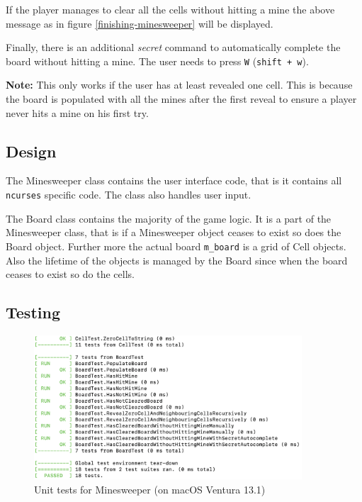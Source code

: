 \documentclass[12pt]{article}
\begin{document}
If the player manages to clear all the cells without hitting a
mine the above message as in figure \ref{finishing-minesweeper}
will be displayed.

Finally, there is an additional \textit{secret} command to
automatically complete the board without hitting a mine. The
user needs to press \texttt{W} (\texttt{shift + w}).

\textbf{Note:} This only works if the user has at least revealed
one cell. This is because the board is populated with all the
mines after the first reveal to ensure a player never hits a
mine on his first try.

\subsection{Design}

\begin{center}

\end{center}

\begin{center}

\end{center}

\begin{center}

\end{center}

\begin{center}

\end{center}

The Minesweeper class contains the user interface code, that
is it contains all \texttt{ncurses} specific code. The class
also handles user input.

The Board class contains the majority of the game logic. It is a
part of the Minesweeper class, that is if a Minesweeper object
ceases to exist so does the Board object. Further more the
actual board \texttt{m\_board} is a grid of Cell objects. Also
the lifetime of the objects is managed by the Board since when
the board ceases to exist so do the cells.

\subsection{Testing}

\begin{figure}[H]
    \centering
    \includegraphics[width=10cm]{./images/unit-tests-minesweeper.png}
    \caption{Unit tests for Minesweeper (on macOS Ventura 13.1)}
\end{figure}
\end{document}
